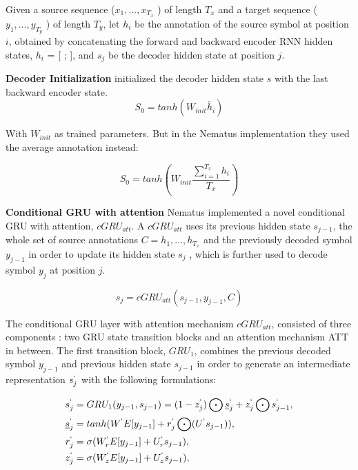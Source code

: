 Given a source sequence ($x_1, . . . , x_T_x$ ) of length $T_x$ and a target sequence ($y_1, . . . , y_T_y$ ) of length $T_y$, let $h_i$ be the annotation of the source symbol at position $i$, obtained by concatenating the forward and backward encoder RNN hidden states, $h_i$ = [ ;  ], and $s_j$ be the decoder hidden state at position $j$.

\textbf{Decoder Initialization} \cite{DBLP:journals/corr/SennrichFCBHHJL17} initialized the decoder hidden state $s$ with the last backward encoder state.
\begin{equation}
S_0 = tanh (W_{init}\overleftarrow{h_i})
\end{equation}

With $W_{init}$ as trained parameters. But in the Nematus implementation they used the average annotation instead:

\begin{equation}
S_0 = tanh (W_{init} \frac{\sum_{i=1}^{T_x}h_i}{T_x})
\end{equation}

\textbf{Conditional GRU with attention} Nematus implemented a novel conditional GRU with attention, $cGRU_{att}$. A $cGRU_{att}$ uses its previous hidden state $s_{j-1}$, the whole set of source annotations $C = {h_1, . . . , h_{T_x}}$ and the previously decoded symbol $y_{j-1}$ in order to update its hidden state $s_j$ , which is further used to decode symbol $y_j$ at position $j$.

\begin{equation}
s_j= cGRU_{att}(s_{j-1},y_{j-1},C)
\end{equation}


The conditional GRU layer with attention mechanism $cGRU_{att}$, consisted of three components : two GRU state transition blocks and an attention mechanism ATT in between. The first transition block, $GRU_1$, combines the previous decoded symbol  $y_{j-1}$ and previous hidden state $s_{j-1}$ in order to generate an intermediate representation $s_j^`$ with the following formulations:


\begin{align*}
s_j^` &= GRU_1(y_{j-1},s_{j-1})=(1-z_j^`)\bigodot \underline{s}_j^`+z_j^`\bigodot s_{j-1}^`,\\
\underline{s}_j^`&= tanh(W^`E[y_{j-1}]+r_j^`\bigodot(U^`s_{j-1})),\\
{r}_j^`&= \sigma (W_r^`E[y_{j-1}]+U_r^`s_{j-1}),\\
{z}_j^`&= \sigma (W_z^`E[y_{j-1}]+U_z^`s_{j-1}),
\end{align*}

